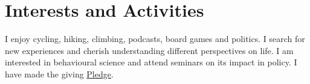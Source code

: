 \documentclass[a4paper,10pt]{article}
\begin{document}
\vspace{-0.3 cm}

\section{Interests and Activities}
I enjoy cycling, hiking, climbing, podcasts, board games and politics. I search for new experiences and cherish understanding different perspectives on life. I am interested in behavioural science and attend seminars on its impact in policy. I have made the giving \href{https://www.givingwhatwecan.org/}{Pledge}.
\end{document}

